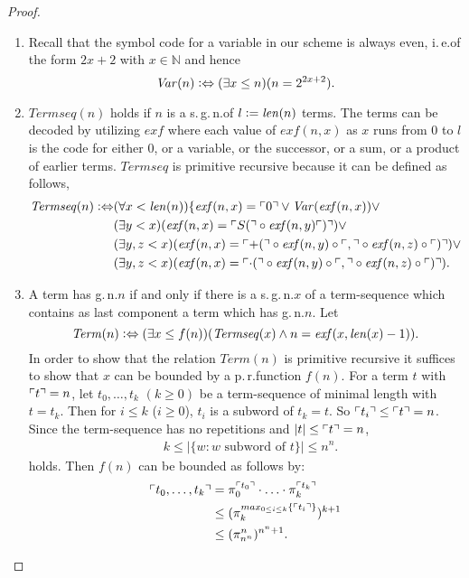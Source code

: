 \begin{proof}
\begin{enumerate}
\item Recall that the symbol code for a variable in our scheme is always even, i.\,e.\@ of the form $2x+2$ with $x \in \mathbb{N}$ and hence \[\mathit{Var}(n) \vcentcolon \Leftrightarrow (\exists x \le n ) (n = 2^{2x+2}).\]
\item $\mathit{Termseq}(n)$ holds if $n$ is a s.\,g.\,n.\@ of $l \vcentcolon= \mathit{len}(n)$ terms. The terms can be decoded by utilizing $\mathit{exf}$ where each value of $\mathit{exf}(n,x)$ as $x$ runs from $0$ to $l$ is the code for either $0$, or a variable, or the successor, or a sum, or a product of earlier terms. $\mathit{Termseq}$ is primitive recursive because it can be defined as follows,
\begin{align*}
\mathit{Termseq}(n)  \vcentcolon \Leftrightarrow & ( \forall x < \mathit{len}(n))  \lbrace \mathit{exf}(n,x) = \ulcorner 0 \urcorner \vee \mathit{Var}(\mathit{exf}(n,x))  \vee \\
& (\exists y < x )  (\mathit{exf}(n,x) = \ulcorner S (\urcorner \circ \mathit{exf}(n,y) \ulcorner ) \urcorner)  \vee \\
& (\exists y, z < x ) (\mathit{exf}(n,x) = \ulcorner +  ( \urcorner \circ \mathit{exf}(n,y) \circ \ulcorner , \urcorner \circ \mathit{exf}(n,z) \circ \ulcorner ) \urcorner )  \vee \\
& (\exists y, z < x ) (\mathit{exf}(n,x) = \ulcorner \cdot  ( \urcorner \circ \mathit{exf}(n,y) \circ \ulcorner , \urcorner \circ \mathit{exf}(n,z) \circ \ulcorner ) \urcorner )  .
\end{align*} 
\item A term has g.\,n.\@ $n$ if and only if there is a s.\,g.\,n.\@ $x$ of a term-sequence which contains as last component a term which has g.\,n.\@ $n$. Let
\[
\mathit{Term}(n) \vcentcolon \Leftrightarrow ( \exists x \le f(n))(\mathit{Termseq}(x) \wedge n = \mathit{exf}(x, \mathit{len}(x)-1)).
\]
In order to show that the relation $\mathit{Term}(n)$ is primitive recursive it suffices to show that $x$ can be bounded by a p.\,r.\@ function $f(n)$. For a term $t$ with $\ulcorner t \urcorner = n$, let $t_0, \ldots, t_k$ $(k \ge 0)$ be a term-sequence of minimal length with $t = t_k$. Then for $i \le k$ ($i \ge 0$), $t_i$ is a subword of $t_k = t$. So $\ulcorner t_i \urcorner \le \ulcorner t \urcorner = n$. Since the term-sequence has no repetitions and $|t| \le \ulcorner t \urcorner = n$,
\begin{align*}
&k \le |\lbrace w : w \text{ subword of }t \rbrace | \le n^n.
\end{align*}
holds. Then $f(n)$ can be bounded as follows by:
\begin{align*}
 \ulcorner t_0, \ldots, t_k \urcorner &= \pi_0^{\ulcorner t_0 \urcorner} \cdot \ldots \cdot \pi_k^{\ulcorner t_k \urcorner} \\
 & \le (\pi_k^{max_{0 \le i \le k} \lbrace \ulcorner t_i \urcorner \rbrace})^{k+1} \\
 & \le (\pi_{n^n}^n)^{n^n+1}.
\end{align*} 
\end{enumerate}
\end{proof}

